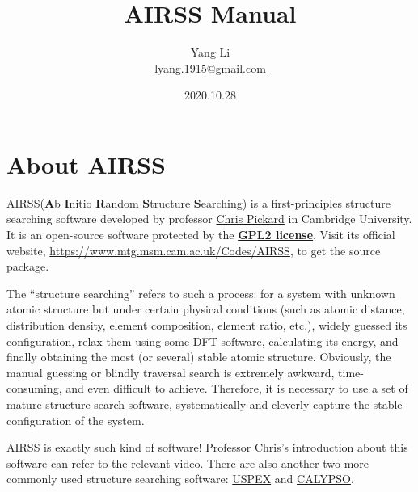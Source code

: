\documentclass[a4paper, 10pt]{article}
\title{\textbf{AIRSS Manual}}
\author{Yang Li\\ \href{mailto:lyang.1915@gmail.com}{lyang.1915@gmail.com}}
\date{2020.10.28}
\begin{document}
\maketitle
\tableofcontents

\newpage
\section{About AIRSS}
AIRSS(\textbf{A}b \textbf{I}nitio \textbf{R}andom \textbf{S}tructure \textbf{S}earching) is a first-principles structure searching software developed by professor \href{https://www.mtg.msm.cam.ac.uk/People/CJP}{Chris Pickard} in Cambridge University. It is an open-source software protected by the \href{https://en.wikipedia.org/wiki/GNU_General_Public_License}{\textbf{GPL2 license}}. Visit its official website, \url{https://www.mtg.msm.cam.ac.uk/Codes/AIRSS}, to get the source package. 

The ``structure searching'' refers to such a process: for a system with unknown atomic structure but under certain physical conditions (such as atomic distance, distribution density, element composition, element ratio, etc.), widely guessed its configuration, relax them using some DFT software, calculating its energy, and finally obtaining the most (or several) stable atomic structure. Obviously, the manual guessing or blindly traversal search is extremely awkward, time-consuming, and even difficult to achieve. Therefore, it is necessary to use a set of mature structure search software, systematically and cleverly capture the stable configuration of the system.

AIRSS is exactly such kind of software! Professor Chris's introduction about this software can refer to the \href{https://www.youtube.com/watch?v=xW6pOYEIKVs&t=1061s}{relevant video}. There are also another two more commonly used structure searching software: \href{http://uspex.stonybrook.edu/uspex.html}{USPEX} and \href{http://www.calypso.cn}{CALYPSO}.
\end{document}
